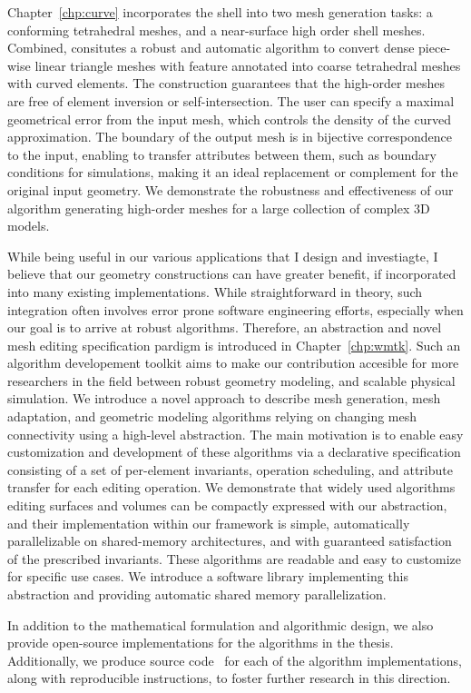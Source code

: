 %

Chapter~\ref*{chp:curve} incorporates the  shell into two mesh generation tasks: a conforming tetrahedral meshes, and a near-surface high order shell meshes. Combined, consitutes a robust and automatic algorithm to convert dense piece-wise linear triangle meshes with feature annotated into coarse tetrahedral meshes with curved elements. The construction guarantees that the high-order meshes are free of element inversion or self-intersection. 
The user can specify a maximal geometrical error from the input mesh, which  controls the density of the curved approximation. The boundary of the output mesh is in bijective correspondence to the input, enabling to transfer attributes between them, such as boundary conditions for simulations, making it an ideal replacement or complement for the original input geometry. We demonstrate the robustness and effectiveness of our algorithm generating high-order meshes for a large collection of complex 3D models.

While being useful in our various applications that I design and investiagte, I believe that our geometry constructions can have greater benefit, if incorporated into many existing implementations. While straightforward in theory, such integration often involves error prone software engineering efforts, especially when our goal is to arrive at robust algorithms. Therefore, an abstraction and novel mesh editing specification pardigm is introduced in Chapter~\ref*{chp:wmtk}. Such an algorithm developement toolkit aims to make our contribution accesible for more researchers in the field between robust geometry modeling, and scalable physical simulation.
We introduce a novel approach to describe mesh generation, mesh adaptation, and geometric modeling algorithms relying on changing mesh connectivity using a high-level abstraction. The main motivation is to enable easy customization and development of these algorithms via a declarative specification consisting of a set of per-element invariants, operation scheduling, and attribute transfer for each editing operation.
We demonstrate that widely used algorithms editing surfaces and volumes can be compactly expressed with our abstraction, and their implementation within our framework is simple, automatically parallelizable on shared-memory architectures, and with guaranteed satisfaction of the prescribed invariants. These algorithms are readable and easy to customize for specific use cases.
We introduce a software library implementing this abstraction and providing automatic shared memory parallelization.

In addition to the mathematical formulation and algorithmic design, we also provide open-source implementations for the algorithms in the thesis.
Additionally, we produce source code~\cite{githubScaffoldMap,githubshell,githubbichon} for each of the algorithm implementations, along with reproducible instructions, to foster further research in this direction.
